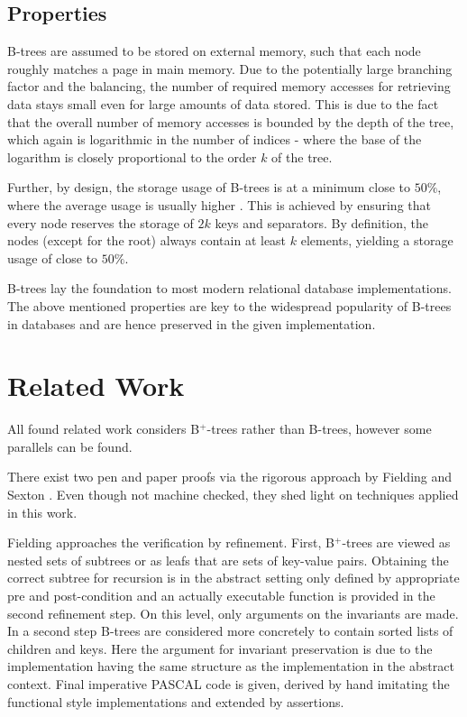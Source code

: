 \subsection{Properties}

B-trees are assumed to be stored on external memory,
such that each node roughly matches a page in main memory.
Due to the potentially large branching factor and the balancing,
the number of required memory accesses for retrieving data stays small even for
large amounts of data stored.
This is due to the fact that the overall number of memory accesses is bounded by the depth
of the tree, which again is logarithmic in the number of indices -
where the base of the logarithm is closely proportional to the order $k$ of the tree.

Further, by design, the storage usage of B-trees is at a minimum close to $50\%$,
where the average usage is usually higher \parencite{DBLP:journals/acta/BayerM72}.
This is achieved by ensuring that every node reserves the storage of $2k$ keys and separators.
By definition, the nodes (except for the root) always contain
at least $k$ elements, yielding a storage usage of close to $50\%$.

B-trees lay the foundation to most modern relational database implementations.
The above mentioned properties are key to the widespread popularity of B-trees
in databases and are hence preserved in the given implementation.

\section{Related Work}

All found related work considers B$^+$-trees
rather than B-trees, however some parallels can be found.

There exist two pen and paper proofs via the rigorous approach
by Fielding \parencite{Fielding80} and Sexton \parencite{DBLP:journals/entcs/SextonT08}.
Even though not machine checked, they shed light on techniques applied in this work.

Fielding approaches the verification by refinement.
First, B$^+$-trees are viewed as nested sets of subtrees
or as leafs that are sets of key-value pairs.
Obtaining the correct subtree for recursion is in the abstract setting
only defined by appropriate pre and post-condition
and an actually executable function is provided in the second refinement step.
On this level, only arguments on the invariants are made.
In a second step B-trees are considered more concretely to contain
sorted lists of children and keys.
Here the argument for invariant preservation is due to the implementation
having the same structure as the implementation in the abstract context.
Final imperative PASCAL code is given, derived by hand
imitating the functional style implementations and extended by assertions.

